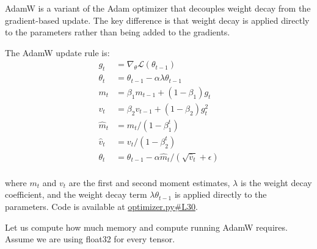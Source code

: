 \begin{answer}
AdamW is a variant of the Adam optimizer that decouples weight decay from the gradient-based update. The key difference is that weight decay is applied directly to the parameters rather than being added to the gradients.

The AdamW update rule is:
\begin{equation*}
\begin{aligned}
g_t &= \nabla_\theta \mathcal{L}(\theta_{t-1}) \\
\theta_t &= \theta_{t-1} - \alpha \lambda \theta_{t-1} \\
m_t &= \beta_1 m_{t-1} + (1 - \beta_1) g_t \\
v_t &= \beta_2 v_{t-1} + (1 - \beta_2) g_t^2 \\
\hat{m}_t &= m_t / (1 - \beta_1^t) \\
\hat{v}_t &= v_t / (1 - \beta_2^t) \\
\theta_t &= \theta_{t-1} - \alpha \hat{m}_t / (\sqrt{\hat{v}_t} + \epsilon) \\
\end{aligned}
\end{equation*}

where $m_t$ and $v_t$ are the first and second moment estimates, $\lambda$ is the weight decay coefficient, and the weight decay term $\lambda \theta_{t-1}$ is applied directly to the parameters. Code is available at \href{https://github.com/donglinkang2021/assignment1-basics/blob/main/cs336_basics/optimizer.py#L30}{optimizer.py\#L30}.
\end{answer}


Let us compute how much memory and compute running AdamW requires. Assume we are using float32 for every tensor.

